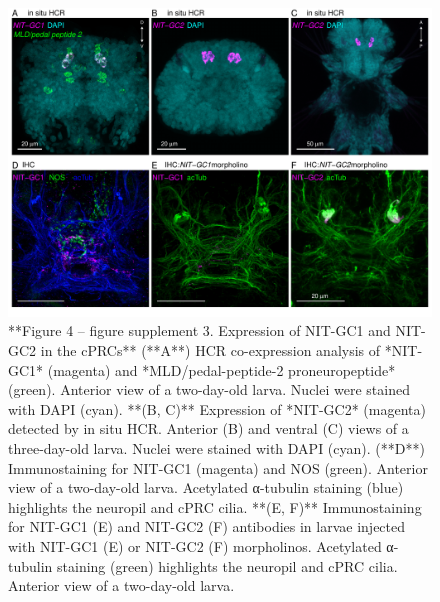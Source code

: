 \documentclass[
  10pt,
  onecolumn]{article}
\begin{document}
\begin{figure}
\includegraphics[width=33.33in]{figures/Fig4_sup3} \caption{**Figure 4 -- figure supplement 3. Expression of NIT-GC1 and NIT-GC2 in the cPRCs** (**A**) HCR co-expression analysis of *NIT-GC1* (magenta) and *MLD/pedal-peptide-2 proneuropeptide* (green). Anterior view of a two-day-old larva. Nuclei were stained with DAPI (cyan). **(B, C)** Expression of *NIT-GC2* (magenta) detected by in situ HCR. Anterior (B) and ventral (C) views of a three-day-old larva. Nuclei were stained with DAPI (cyan). (**D**) Immunostaining for NIT-GC1 (magenta) and NOS (green). Anterior view of a two-day-old larva. Acetylated α-tubulin staining (blue) highlights the neuropil and cPRC cilia. **(E, F)** Immunostaining for NIT-GC1 (E) and NIT-GC2 (F) antibodies in larvae injected with NIT-GC1 (E) or NIT-GC2 (F) morpholinos. Acetylated α-tubulin staining (green) highlights the neuropil and cPRC cilia. Anterior view of a two-day-old larva.}\label{fig:unnamed-chunk-15}
\end{figure}
\end{document}

